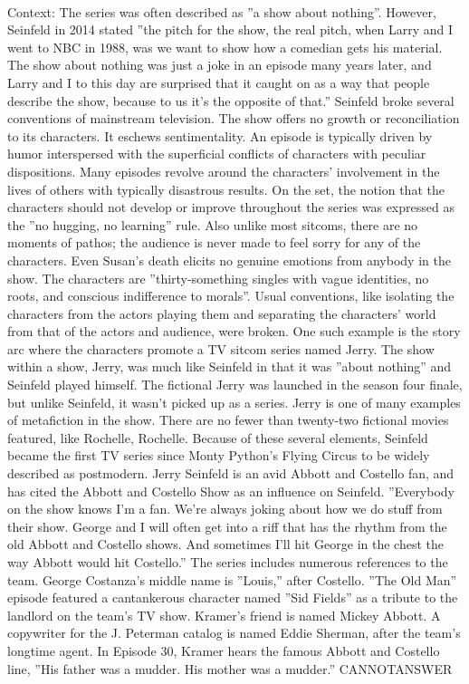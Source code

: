 \documentclass[11pt,a4paper, onecolumn]{article}
\begin{document}
\\ Context: The series was often described as ''a show about nothing''. However, Seinfeld in 2014 stated ''the pitch for the show, the real pitch, when Larry and I went to NBC in 1988, was we want to show how a comedian gets his material. The show about nothing was just a joke in an episode many years later, and Larry and I to this day are surprised that it caught on as a way that people describe the show, because to us it's the opposite of that.'' Seinfeld broke several conventions of mainstream television. The show offers no growth or reconciliation to its characters. It eschews sentimentality. An episode is typically driven by humor interspersed with the superficial conflicts of characters with peculiar dispositions. Many episodes revolve around the characters' involvement in the lives of others with typically disastrous results. On the set, the notion that the characters should not develop or improve throughout the series was expressed as the ''no hugging, no learning'' rule. Also unlike most sitcoms, there are no moments of pathos; the audience is never made to feel sorry for any of the characters. Even Susan's death elicits no genuine emotions from anybody in the show. The characters are ''thirty-something singles with vague identities, no roots, and conscious indifference to morals''. Usual conventions, like isolating the characters from the actors playing them and separating the characters' world from that of the actors and audience, were broken. One such example is the story arc where the characters promote a TV sitcom series named Jerry. The show within a show, Jerry, was much like Seinfeld in that it was ''about nothing'' and Seinfeld played himself. The fictional Jerry was launched in the season four finale, but unlike Seinfeld, it wasn't picked up as a series. Jerry is one of many examples of metafiction in the show. There are no fewer than twenty-two fictional movies featured, like Rochelle, Rochelle. Because of these several elements, Seinfeld became the first TV series since Monty Python's Flying Circus to be widely described as postmodern. Jerry Seinfeld is an avid Abbott and Costello fan, and has cited the Abbott and Costello Show as an influence on Seinfeld. ''Everybody on the show knows I'm a fan. We're always joking about how we do stuff from their show. George and I will often get into a riff that has the rhythm from the old Abbott and Costello shows. And sometimes I'll hit George in the chest the way Abbott would hit Costello.'' The series includes numerous references to the team. George Costanza's middle name is ''Louis,'' after Costello. ''The Old Man'' episode featured a cantankerous character named ''Sid Fields'' as a tribute to the landlord on the team's TV show. Kramer's friend is named Mickey Abbott. A copywriter for the J. Peterman catalog is named Eddie Sherman, after the team's longtime agent. In Episode 30, Kramer hears the famous Abbott and Costello line, ''His father was a mudder. His mother was a mudder.'' CANNOTANSWER
\end{document}
